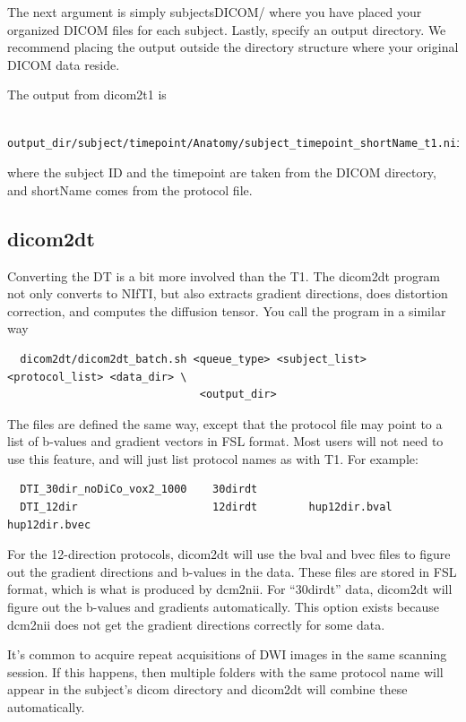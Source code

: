\documentclass{InsightArticle}
\begin{document}
The next argument is simply subjectsDICOM/ where you have placed your organized DICOM files for each subject. Lastly, specify
an output directory. We recommend placing the output outside the directory structure where your original DICOM data reside.

The output from dicom2t1 is 
\begin{verbatim}
  output_dir/subject/timepoint/Anatomy/subject_timepoint_shortName_t1.nii.gz
\end{verbatim}
where the subject ID and the timepoint are taken from the DICOM directory, and shortName comes from the protocol file.


\subsection{dicom2dt}

Converting the DT is a bit more involved than the T1. The dicom2dt program not only converts to NIfTI, but also extracts
gradient directions, does distortion correction, and computes the diffusion tensor. You call the program in a similar way
\begin{verbatim}
  dicom2dt/dicom2dt_batch.sh <queue_type> <subject_list> <protocol_list> <data_dir> \
                              <output_dir>
\end{verbatim}
The files are defined the same way, except that the protocol file may point to a list of b-values and gradient vectors in FSL format.
Most users will not need to use this feature, and will just list protocol names as with T1. For example:

\begin{verbatim}
  DTI_30dir_noDiCo_vox2_1000    30dirdt
  DTI_12dir                     12dirdt        hup12dir.bval    hup12dir.bvec
\end{verbatim}

For the 12-direction protocols, dicom2dt will use the bval and bvec files to figure out the gradient directions 
and b-values in the data. These files are stored in FSL format, which is what is produced by dcm2nii. For ``30dirdt'' data, 
dicom2dt will figure out the b-values and gradients automatically. This option exists because dcm2nii does not get the gradient 
directions correctly for some data.

It's common to acquire repeat acquisitions of DWI images in the same scanning session. If this happens, then multiple folders
with the same protocol name will appear in the subject's dicom directory and dicom2dt will combine these automatically.
\end{document}
